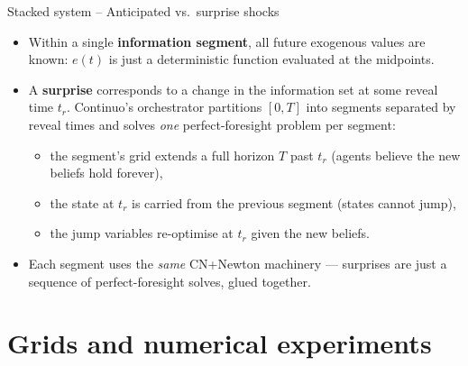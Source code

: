 \documentclass[11pt,aspectratio=169]{beamer}
\begin{document}
\begin{frame}{Stacked system -- Anticipated vs.\ surprise shocks}

\begin{itemize}

\item Within a single \textbf{information segment}, all future
  exogenous values are known: $e(t)$ is just a deterministic function
  evaluated at the midpoints.\newline

\item A \textbf{surprise} corresponds to a change in the information
  set at some reveal time $t_r$. Continuo's orchestrator
  partitions $[0,T]$ into segments separated by reveal times and
  solves \emph{one} perfect-foresight problem per segment:\newline
  \begin{itemize}
  \item the segment's grid extends a full horizon $T$ past $t_r$
    (agents believe the new beliefs hold forever),\newline
  \item the state at $t_r$ is carried from the previous
    segment (states cannot jump),\newline
  \item the jump variables re-optimise at $t_r$ given the new
    beliefs.\newline
  \end{itemize}

\item Each segment uses the \emph{same} CN+Newton machinery — surprises
  are just a sequence of perfect-foresight solves, glued together.

\end{itemize}

\end{frame}

\section{Grids and numerical experiments}
\end{document}
